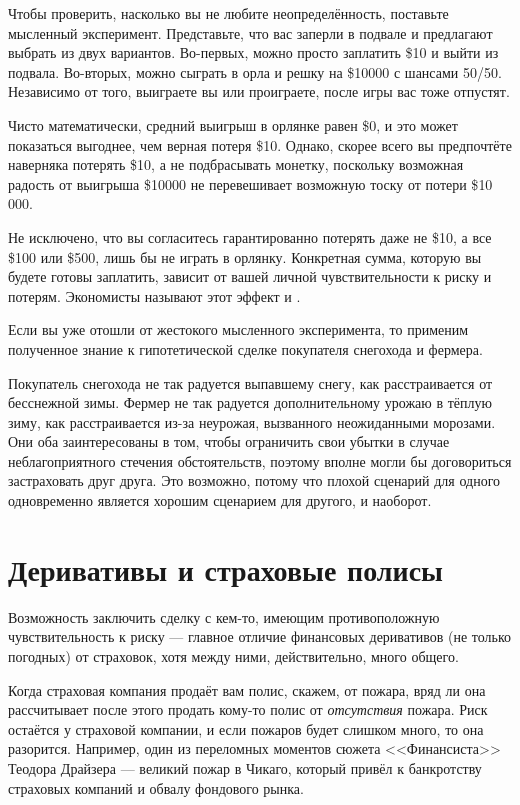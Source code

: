 Чтобы проверить, насколько вы не любите неопределённость, поставьте мысленный эксперимент. Представьте, что вас заперли в подвале и предлагают выбрать из двух вариантов. Во-первых, можно просто заплатить \$10 и выйти из подвала. Во-вторых, можно сыграть в орла и решку на \$\num{10000} с шансами 50/50. Независимо от того, выиграете вы или проиграете, после игры вас тоже отпустят. 

Чисто математически, средний выигрыш в орлянке равен \$0, и это может показаться выгоднее, чем верная потеря \$10. Однако, скорее всего вы предпочтёте наверняка потерять \$10, а не подбрасывать монетку, поскольку возможная радость от выигрыша \$\num{10 000} не перевешивает возможную тоску от потери \${10 000}.

Не исключено, что вы согласитесь гарантированно потерять даже не \$10, а все \$100 или \$500, лишь бы не играть в орлянку. Конкретная сумма, которую вы будете готовы заплатить, зависит от вашей личной чувствительности к риску и потерям. Экономисты называют этот эффект  и .

Если вы уже отошли от жестокого мысленного эксперимента, то применим полученное знание к гипотетической сделке покупателя снегохода и фермера.

Покупатель снегохода не так радуется выпавшему снегу, как расстраивается от бесснежной зимы. Фермер не так радуется дополнительному урожаю в тёплую зиму, как расстраивается из-за неурожая, вызванного неожиданными морозами. Они оба заинтересованы в том, чтобы ограничить свои убытки в случае неблагоприятного стечения обстоятельств, поэтому вполне могли бы договориться застраховать друг друга. Это возможно, потому что плохой сценарий для одного одновременно является хорошим сценарием для другого, и наоборот.

\section*{Деривативы и страховые полисы}

Возможность заключить сделку с кем-то, имеющим противоположную чувствительность к риску --- главное отличие финансовых деривативов (не только погодных) от страховок,
хотя между ними, действительно, много общего.

Когда страховая компания продаёт вам
полис, скажем, от пожара, вряд ли она рассчитывает после этого продать кому-то полис от
\emph{отсутствия} пожара. Риск остаётся у страховой компании, и если пожаров будет
слишком много, то она разорится. Например, один из переломных моментов сюжета <<Финансиста>>
Теодора Драйзера --- великий пожар в Чикаго, который привёл к банкротству страховых
компаний и обвалу фондового рынка.

